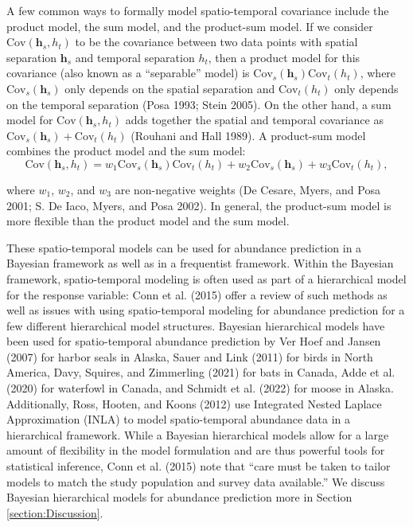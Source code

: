 \documentclass[smallextended]{svjour3}       %
\begin{document}
A few common ways to formally model spatio-temporal covariance include
the product model, the sum model, and the product-sum model. If we
consider \(\text{Cov}(\mathbf{h}_s, h_t)\) to be the covariance between
two data points with spatial separation \(\mathbf{h}_s\) and temporal
separation \(h_t\), then a product model for this covariance (also known
as a ``separable'' model) is
\(\text{Cov}_s(\mathbf{h}_s) \text{Cov}_t(h_t)\), where
\(\text{Cov}_s(\mathbf{h}_s)\) only depends on the spatial separation
and \(\text{Cov}_t(h_t)\) only depends on the temporal separation (Posa
1993; Stein 2005). On the other hand, a sum model for
\(\text{Cov}(\mathbf{h}_s, h_t)\) adds together the spatial and temporal
covariance as \(\text{Cov}_s(\mathbf{h}_s) + \text{Cov}_t(h_t)\)
(Rouhani and Hall 1989). A product-sum model combines the product model
and the sum model: \mbox{} \begin{equation}
\text{Cov}(\mathbf{h}_s, h_t) = w_1\text{Cov}_s(\mathbf{h}_s) \text{Cov}_t(h_t) + w_2\text{Cov}_s(\mathbf{h}_s) + w_3\text{Cov}_t(h_t),
\end{equation}

\noindent where \(w_1\), \(w_2\), and \(w_3\) are non-negative weights
(De Cesare, Myers, and Posa 2001; S. De Iaco, Myers, and Posa 2002). In
general, the product-sum model is more flexible than the product model
and the sum model.

These spatio-temporal models can be used for abundance prediction in a
Bayesian framework as well as in a frequentist framework. Within the
Bayesian framework, spatio-temporal modeling is often used as part of a
hierarchical model for the response variable: Conn et al. (2015) offer a
review of such methods as well as issues with using spatio-temporal
modeling for abundance prediction for a few different hierarchical model
structures. Bayesian hierarchical models have been used for
spatio-temporal abundance prediction by Ver Hoef and Jansen (2007) for
harbor seals in Alaska, Sauer and Link (2011) for birds in North
America, Davy, Squires, and Zimmerling (2021) for bats in Canada, Adde
et al. (2020) for waterfowl in Canada, and Schmidt et al. (2022) for
moose in Alaska. Additionally, Ross, Hooten, and Koons (2012) use
Integrated Nested Laplace Approximation (INLA) to model spatio-temporal
abundance data in a hierarchical framework. While a Bayesian
hierarchical models allow for a large amount of flexibility in the model
formulation and are thus powerful tools for statistical inference, Conn
et al. (2015) note that ``care must be taken to tailor models to match
the study population and survey data available.'' We discuss Bayesian
hierarchical models for abundance prediction more in Section
\ref{section:Discussion}.
\end{document}
